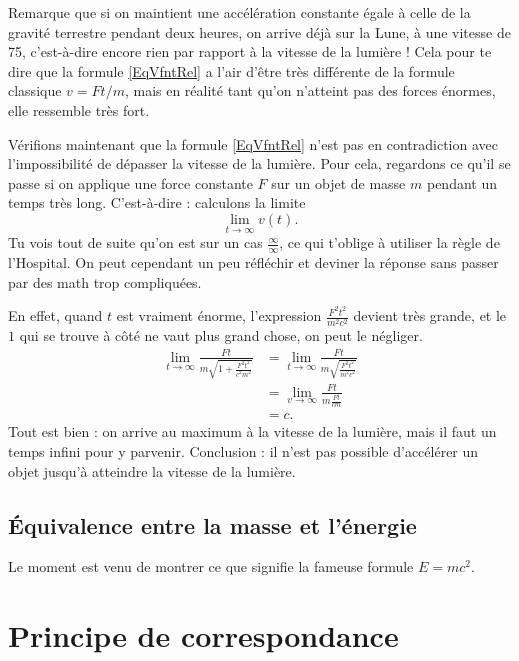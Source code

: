 Remarque que si on maintient une accélération constante égale à celle de la gravité terrestre pendant deux heures, on arrive déjà sur la Lune, à une vitesse de \unit{75}{\kilo\meter\per\second}, c'est-à-dire encore rien par rapport à la vitesse de la lumière ! Cela pour te dire que la formule \eqref{EqVfntRel} a l'air d'être très différente de la formule classique \( v=Ft/m\), mais en réalité tant qu'on n'atteint pas des forces énormes, elle ressemble très fort.

Vérifions maintenant que la formule \eqref{EqVfntRel} n'est pas en contradiction avec l'impossibilité de dépasser la vitesse de la lumière. Pour cela, regardons ce qu'il se passe si on applique une force constante \( F\) sur un objet de masse \( m\) pendant un temps très long. C'est-à-dire : calculons la limite
\[
	\lim_{t\to\infty}v(t).
\]
Tu vois tout de suite qu'on est sur un cas \( \frac{ \infty }{ \infty }\), ce qui t'oblige à utiliser la règle de l'Hospital. On peut cependant un peu réfléchir et deviner la réponse sans passer par des math trop compliquées.

En effet, quand \( t\) est vraiment énorme, l'expression \( \frac{ F^2t^2 }{ m^2c^2 }\) devient très grande, et le \( 1\) qui se trouve à côté ne vaut plus grand chose, on peut le négliger.
\begin{equation}
	\begin{split}
		\lim_{t\to\infty}\frac{ Ft }{ m\sqrt{1+\frac{ F^2t^2 }{ c^2m^2 }} }&=\lim_{t\to\infty}\frac{ Ft }{ m\sqrt{\frac{ F^2t^2 }{ m^2c^2 }} }\\
		&=\lim_{v\to\infty}\frac{ Ft }{ m\frac{ Ft }{ cm } }\\
		&=c.
	\end{split}
\end{equation}
Tout est bien : on arrive au maximum à la vitesse de la lumière, mais il faut un temps infini pour y parvenir. Conclusion : il n'est pas possible d'accélérer un objet jusqu'à atteindre la vitesse de la lumière.

\subsection{Équivalence entre la masse et l'énergie}

Le moment est venu de montrer ce que signifie la fameuse formule \( E=mc^2\).

\section{Principe de correspondance}

